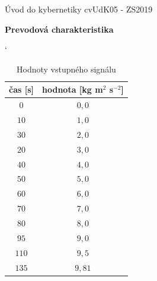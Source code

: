 \documentclass[a4paper, 10pt, ]{article}
\def\oznacenieCasti{cvUdK05 - ZS2019}
\begin{document}
\lstset{style=mystyle}





\fontsize{12pt}{22pt}\selectfont

\centerline{\textsf{Úvod do kybernetiky} \hfill \textsf{\oznacenieCasti}}

\fontsize{18pt}{22pt}\selectfont





\begin{flushleft}
    \textbf{\textsf{Prevodová charakteristika}}
\end{flushleft}



\normalsize

\bigskip

\tableofcontents

\bigskip

\vspace{18pt}












\begin{table}[b]
	\centering
	\catcode`

\caption{Hodnoty vstupného signálu}
\label{Hodnoty vstupného signálu}
\begin{tabular}{     c      c       }

\toprule
čas [s] & hodnota [kg m$^2$ s$^{-2}$] \\
\midrule
$0$ & $0,0$ \\
$10$ & $1,0$ \\
$30$ & $2,0$ \\
$20$ & $3,0$ \\
$40$ & $4,0$ \\
$50$ & $5,0$ \\
$60$ & $6,0$ \\
$70$ & $7,0$ \\
$80$ & $8,0$ \\
$95$ & $9,0$ \\
$110$ & $9,5$ \\
$135$ & $9,81$ \\
\bottomrule
\end{tabular}
\end{table}
\end{document}
